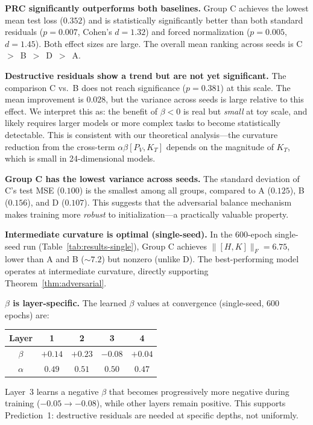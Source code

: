 \documentclass[11pt,a4paper]{article}
\theoremstyle{definition}
\begin{document}
\textbf{PRC significantly outperforms both baselines.}
Group C achieves the lowest mean test loss ($0.352$) and is statistically
significantly better than both standard residuals ($p = 0.007$, Cohen's
$d = 1.32$) and forced normalization ($p = 0.005$, $d = 1.45$). Both
effect sizes are large. The overall mean ranking across seeds is
C~$>$~B~$>$~D~$>$~A.

\textbf{Destructive residuals show a trend but are not yet significant.}
The comparison C vs.\ B does not reach significance ($p = 0.381$) at this
scale. The mean improvement is $0.028$, but the variance across seeds is
large relative to this effect. We interpret this as: the benefit of
$\beta < 0$ is real but \emph{small} at toy scale, and likely requires
larger models or more complex tasks to become statistically detectable.
This is consistent with our theoretical analysis---the curvature reduction
from the cross-term $\alpha\beta[P_V, K_T]$ depends on the magnitude of
$K_T$, which is small in 24-dimensional models.

\textbf{Group C has the lowest variance across seeds.}
The standard deviation of C's test MSE ($0.100$) is the smallest among all
groups, compared to A ($0.125$), B ($0.156$), and D ($0.107$). This
suggests that the adversarial balance mechanism makes training more
\emph{robust} to initialization---a practically valuable property.

\textbf{Intermediate curvature is optimal (single-seed).}
In the 600-epoch single-seed run (Table~\ref{tab:results-single}), Group C
achieves $\|[H,K]\|_F = 6.75$, lower than A and B ($\sim 7.2$) but nonzero
(unlike D). The best-performing model operates at intermediate curvature,
directly supporting Theorem~\ref{thm:adversarial}.

\textbf{$\beta$ is layer-specific.}
The learned $\beta$ values at convergence (single-seed, 600 epochs) are:
\begin{center}
\begin{tabular}{ccccc}
Layer & 1 & 2 & 3 & 4 \\
\midrule
$\beta$ & $+0.14$ & $+0.23$ & $-0.08$ & $+0.04$ \\
$\alpha$ & $0.49$ & $0.51$ & $0.50$ & $0.47$ \\
\end{tabular}
\end{center}
Layer~3 learns a negative $\beta$ that becomes progressively more negative
during training ($-0.05 \to -0.08$), while other layers remain positive.
This supports Prediction~1: destructive residuals are needed at specific
depths, not uniformly.
\end{document}
